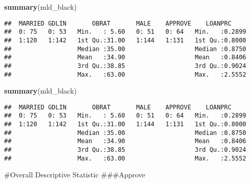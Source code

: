 \documentclass[]{article}
\newenvironment{Shaded}{\begin{snugshade}}{\end{snugshade}}
\newcommand{\DataTypeTok}[1]{\textcolor[rgb]{0.13,0.29,0.53}{#1}}
\newcommand{\KeywordTok}[1]{\textcolor[rgb]{0.13,0.29,0.53}{\textbf{#1}}}
\newcommand{\NormalTok}[1]{#1}
\newcommand{\OperatorTok}[1]{\textcolor[rgb]{0.81,0.36,0.00}{\textbf{#1}}}
\newcommand{\OtherTok}[1]{\textcolor[rgb]{0.56,0.35,0.01}{#1}}
\newcommand{\StringTok}[1]{\textcolor[rgb]{0.31,0.60,0.02}{#1}}
\begin{document}
\begin{Shaded}
\begin{Highlighting}[]
\KeywordTok{summary}\NormalTok{(mld_black)}
\end{Highlighting}
\end{Shaded}

\begin{verbatim}
##  MARRIED GDLIN       OBRAT       MALE    APPROVE    LOANPRC      
##  0: 75   0: 53   Min.   : 5.60   0: 51   0: 64   Min.   :0.2899  
##  1:120   1:142   1st Qu.:31.00   1:144   1:131   1st Qu.:0.8000  
##                  Median :35.00                   Median :0.8750  
##                  Mean   :34.90                   Mean   :0.8406  
##                  3rd Qu.:38.85                   3rd Qu.:0.9024  
##                  Max.   :63.00                   Max.   :2.5552
\end{verbatim}

\begin{Shaded}
\begin{Highlighting}[]
\KeywordTok{summary}\NormalTok{(mld_black)}
\end{Highlighting}
\end{Shaded}

\begin{verbatim}
##  MARRIED GDLIN       OBRAT       MALE    APPROVE    LOANPRC      
##  0: 75   0: 53   Min.   : 5.60   0: 51   0: 64   Min.   :0.2899  
##  1:120   1:142   1st Qu.:31.00   1:144   1:131   1st Qu.:0.8000  
##                  Median :35.00                   Median :0.8750  
##                  Mean   :34.90                   Mean   :0.8406  
##                  3rd Qu.:38.85                   3rd Qu.:0.9024  
##                  Max.   :63.00                   Max.   :2.5552
\end{verbatim}

\#Overall Descriptive Statistic \#\#\#Approve

\begin{Shaded}
\end{Shaded}
\end{document}
